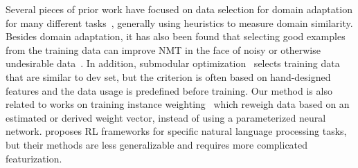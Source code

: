 Several pieces of prior work have focused on data selection for domain adaptation for many different tasks~\citep{moore2010intelligent,axelrod2011domain,domain_adapt_transfer,jiang-zhai-2007-instance,foster-etal-2010-discriminative,wang-etal-2017-instance}, generally using heuristics to measure domain similarity.
Besides domain adaptation, it has also been found that selecting good examples from the training data can improve NMT in the face of noisy or otherwise undesirable data~\citep{vyas-etal-2018-identifying,pham-etal-2018-fixing}. In addition, submodular optimization~\citep{submodular_mt,learn_mix_submodular} selects training data that are similar to dev set, but the criterion is often based on hand-designed features and the data usage is predefined before training. Our method is also related to works on training instance weighting~\citep{importance_weight,learn_reweight,jiang-zhai-2007-instance,domain_adapt_transfer} which reweigh data based on an estimated or derived weight vector, instead of using a parameterized neural network.
\cite{reinforce_cotrain,rl_nmt,learn_active_learn} proposes RL frameworks for specific natural language processing tasks, but their methods are less generalizable and requires more complicated featurization.   




